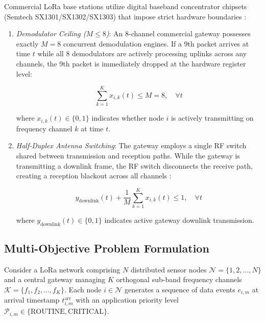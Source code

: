 \documentclass[preprint,review,12pt]{elsarticle}
\begin{document}
Commercial LoRa base stations utilize digital baseband concentrator chipsets (Semtech SX1301/SX1302/SX1303) that impose strict hardware boundaries \cite{sahoo2025lorahart}:

\begin{enumerate}

    \item \textit{Demodulator Ceiling ($M \le 8$)}: An 8-channel commercial gateway possesses exactly $M = 8$ concurrent demodulation engines. If a 9th packet arrives at time $t$ while all 8 demodulators are actively processing uplinks across any channels, the 9th packet is immediately dropped at the hardware register level:

    \begin{equation}

    \label{eq:demod_limit}

    \sum_{k=1}^K x_{i,k}(t) \le M = 8, \quad \forall t

    \end{equation}

    where $x_{i,k}(t) \in \{0, 1\}$ indicates whether node $i$ is actively transmitting on frequency channel $k$ at time $t$.

    \item \textit{Half-Duplex Antenna Switching}: The gateway employs a single RF switch shared between transmission and reception paths. While the gateway is transmitting a downlink frame, the RF switch disconnects the receive path, creating a reception blackout across all channels \cite{sahoo2025lorahart}:

    \begin{equation}

    \label{eq:half_duplex}

    y_{\text{downlink}}(t) + \frac{1}{M}\sum_{k=1}^K x_{i,k}(t) \le 1, \quad \forall t

    \end{equation}

    where $y_{\text{downlink}}(t) \in \{0, 1\}$ indicates active gateway downlink transmission.

\end{enumerate}

\subsection{Multi-Objective Problem Formulation}

Consider a LoRa network comprising $N$ distributed sensor nodes $\mathcal{N} = \{1, 2, \dots, N\}$ and a central gateway managing $K$ orthogonal sub-band frequency channels $\mathcal{K} = \{f_1, f_2, \dots, f_K\}$. Each node $i \in \mathcal{N}$ generates a sequence of data events $e_{i,m}$ at arrival timestamp $t_{i,m}^{\text{arr}}$ with an application priority level $\mathcal{P}_{i,m} \in \{\text{ROUTINE}, \text{CRITICAL}\}$.
\end{document}

